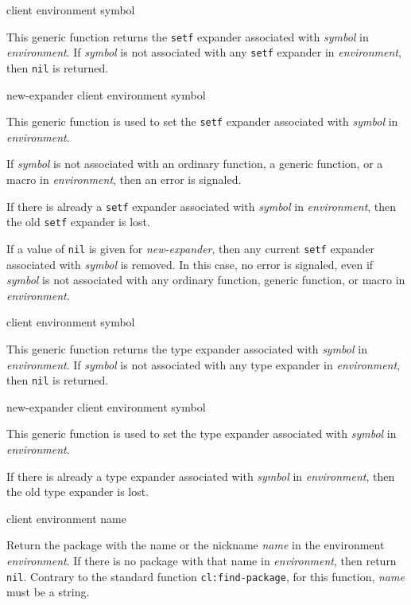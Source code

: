  {client environment symbol}

This generic function returns the \texttt{setf} expander associated
with \textit{symbol} in \textit{environment}.  If \textit{symbol} is
not associated with any \texttt{setf} expander in
\textit{environment}, then \texttt{nil} is returned.

 {new-expander client environment symbol}

This generic function is used to set the \texttt{setf} expander
associated with \textit{symbol} in \textit{environment}.

If \textit{symbol} is not associated with an ordinary function, a
generic function, or a macro in \textit{environment}, then an error is
signaled.

If there is already a \texttt{setf} expander associated with
\textit{symbol} in \textit{environment}, then the old \texttt{setf}
expander is lost.

If a value of \texttt{nil} is given for \textit{new-expander}, then
any current \texttt{setf} expander associated with \textit{symbol} is
removed.  In this case, no error is signaled, even if \textit{symbol}
is not associated with any ordinary function, generic function, or
macro in \textit{environment}.

 {client environment symbol}

This generic function returns the type expander associated with
\textit{symbol} in \textit{environment}.  If \textit{symbol} is not
associated with any type expander in \textit{environment}, then
\texttt{nil} is returned.

 {new-expander client environment symbol}

This generic function is used to set the type expander associated with
\textit{symbol} in \textit{environment}.

If there is already a type expander associated with \textit{symbol} in
\textit{environment}, then the old type expander is lost.

 {client environment name}

Return the package with the name or the nickname \textit{name} in the
environment \textit{environment}.  If there is no package with that
name in \textit{environment}, then return \texttt{nil}.  Contrary to
the standard \commonlisp{} function \texttt{cl:find-package}, for this
function, \textit{name} must be a string.

